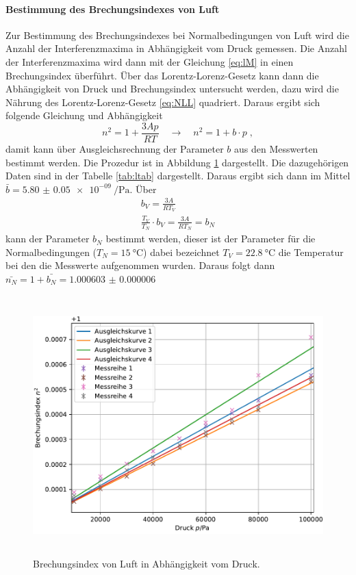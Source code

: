 \paragraph{Bestimmung des Brechungsindexes von Luft}
Zur Bestimmung des Brechungsindexes bei Normalbedingungen von Luft wird die Anzahl der Interferenzmaxima 
in Abhängigkeit vom Druck gemessen. Die Anzahl der Interferenzmaxima wird dann mit der Gleichung 
\eqref{eq:lM} in einen Brechungsindex überführt. Über das Lorentz-Lorenz-Gesetz kann dann die 
Abhängigkeit von Druck und Brechungsindex untersucht werden, dazu wird die Nährung des Lorentz-Lorenz-Gesetz 
\eqref{eq:NLL} quadriert. 
Daraus ergibt sich folgende Gleichung und Abhängigkeit
\begin{equation}
n^2 = 1 + \frac{3Ap}{RT} \quad \rightarrow \quad n^2 = 1+ b \cdot p \; ,
\label{eq:brechl}
\end{equation}
damit kann über Ausgleichsrechnung der Parameter $b$ aus den Messwerten bestimmt werden. 
Die Prozedur ist in Abbildung \ref{fig:Lplot} dargestellt. 
Die dazugehörigen Daten sind in der Tabelle \ref{tab:ltab} dargestellt. 
Daraus ergibt sich dann im Mittel $ \bar{b} = \SI{5.80(5)e-09}{\per\Pa}$. 
Über 
\begin{gather}
b_V =  \frac{3A}{RT_V} \\
\frac{T_V}{T_N} \cdot b_V =\frac{3A}{RT_N} = b_N
\end{gather}
kann der Parameter $b_N$ bestimmt werden, dieser ist der Parameter für die Normalbedingungen 
($T_N = \SI{15}{\celsius}$) dabei bezeichnet $T_V = \SI{22,8}{\celsius}$ die Temperatur bei den die 
Messwerte aufgenommen wurden. 
Daraus folgt dann $ \bar{n_{N}} = 1 +  \bar{b_{N}} = \SI{1.000603(6)}{}$
\begin{figure}
  \centering
  \includegraphics[height = 10cm]{plots/Luftplot.pdf}
  \caption{Brechungsindex von Luft in Abhängigkeit vom Druck.}
  \label{fig:Lplot}
\end{figure}

